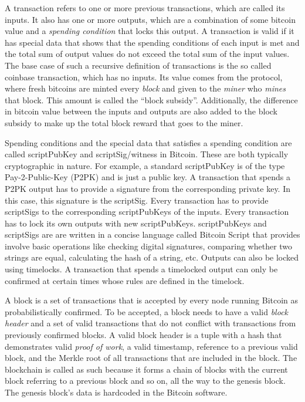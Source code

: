 A  transaction refers to one or more previous transactions, which are called its inputs. It also has one or more outputs, which are a combination of some bitcoin value and a \textit{spending condition} that locks this output. A transaction is valid if it has special data that shows that the spending conditions of each input is met and the total sum of output values do not exceed the total sum of the input values. The base case of such a recursive definition of transactions is the so called coinbase transaction, which has no inputs. Its value comes from the protocol, where fresh bitcoins are minted every \textit{block} and given to the \textit{miner} who \textit{mines} that block. This amount is called the ``block subsidy''. Additionally, the difference in bitcoin value between the inputs and outputs are also added to the block subsidy to make up the total block reward that goes to the miner.

Spending conditions and the special data that satisfies a spending condition are called scriptPubKey and scriptSig/witness in Bitcoin. These are both typically cryptographic in nature. For example, a standard scriptPubKey is of the type Pay-2-Public-Key (P2PK) and is just a public key. A transaction that spends a P2PK output has to provide a signature from the corresponding private key. In this case, this signature is the scriptSig. Every transaction has to provide scriptSigs to the corresponding scriptPubKeys of the inputs. Every transaction has to lock its own outputs with new scriptPubKeys. scriptPubKeys and scriptSigs are are written in a concise language called Bitcoin Script that provides involve basic operations like checking digital signatures, comparing whether two strings are equal, calculating the hash of a string, etc. Outputs can also be locked using timelocks. A transaction that spends a timelocked output can only be confirmed at certain times whose rules are defined in the timelock. 

A block is a set of transactions that is accepted by every node running Bitcoin as probabilistically confirmed. To be accepted, a block needs to have a valid \textit{block header} and a set of valid transactions that do not conflict with transactions from previously confirmed blocks. A valid block header is a tuple with a hash that demonstrates valid \textit{proof of work}, a valid timestamp, reference to a previous valid block, and the Merkle root of all transactions that are included in the block. The blockchain is called as such because it forms a chain of blocks with the current block referring to a previous block and so on, all the way to the genesis block. The genesis block's data is hardcoded in the Bitcoin software. 

